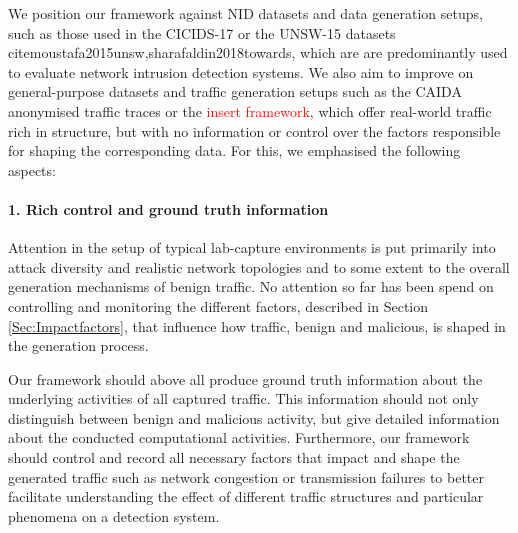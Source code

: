 \documentclass[sigconf]{acmart}
\begin{document}
We position our framework against NID datasets and data generation setups, such as those used in the CICIDS-17 or the UNSW-15 datasets cite{moustafa2015unsw,sharafaldin2018towards}, which are are predominantly used to evaluate network intrusion detection systems. We also aim to improve on general-purpose datasets and traffic generation setups such as the CAIDA anonymised traffic traces \cite{walsworth2015caida} or the \textcolor{red}{insert framework}, which offer real-world traffic rich in structure, but with no information or control over the  factors responsible for shaping the corresponding data. For this, we emphasised the following aspects:







\paragraph{1. Rich control and ground truth information} Attention in the setup of typical lab-capture environments is put primarily into attack diversity and realistic network topologies and to some extent to the overall generation mechanisms of benign traffic. No attention so far has been spend on controlling and monitoring the different factors, described in Section \ref{Sec:Impactfactors}, that influence how traffic, benign and malicious, is shaped in the generation process. 

Our framework should above all produce ground truth information about the underlying activities of all captured traffic. This information should not only distinguish between benign and malicious activity, but give detailed information about the conducted computational activities. Furthermore, our framework should control and record all necessary factors that impact and shape the generated traffic such as network congestion or transmission failures to better facilitate understanding the effect of different traffic structures and particular phenomena on a detection system.

\end{document}
